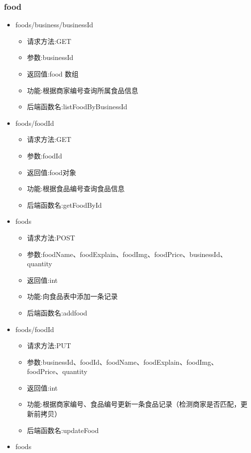 \subsubsection*{food}
\begin{itemize}
   
    \item foods/business/{businessId}
     \begin{itemize}
    \item 请求方法:GET
    \item 参数:businessId
    \item 返回值:food 数组
    \item 功能:根据商家编号查询所属食品信息
    \item 后端函数名:listFoodByBusinessId
    \end{itemize}
    \item foods/{foodId}
    \begin{itemize} 
    \item 请求方法:GET
    \item 参数:foodId
    \item 返回值:food对象
    \item 功能:根据食品编号查询食品信息
    \item 后端函数名:getFoodById
    \end{itemize}
    \item foods
    \begin{itemize}
    \item 请求方法:POST
    \item 参数:foodName、foodExplain、foodImg、foodPrice、businessId、quantity
    \item 返回值:int
    \item 功能:向食品表中添加一条记录
    \item 后端函数名:addfood
    \end{itemize}
    \item foods/{foodId}
    \begin{itemize}
    \item 请求方法:PUT
    \item 参数:businessId、foodId、foodName、foodExplain、foodImg、foodPrice、quantity
    \item 返回值:int
    \item 功能:根据商家编号、食品编号更新一条食品记录（检测商家是否匹配，更新前拷贝）
    \item 后端函数名:updateFood
    \end{itemize}
    \item foods

\end{itemize}
